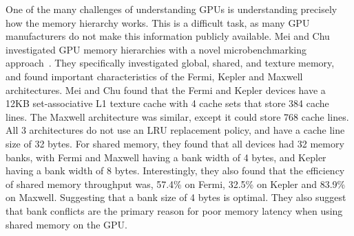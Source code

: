 One of the many challenges of understanding GPUs is understanding precisely how the memory hierarchy works.
This is a difficult task, as many GPU manufacturers do not make this information publicly available.
Mei and Chu investigated GPU memory hierarchies with a novel microbenchmarking approach~\cite{Mei2015}.
They specifically investigated global, shared, and texture memory, and found important characteristics of the Fermi, Kepler and Maxwell architectures.
Mei and Chu found that the Fermi and Kepler devices have a 12KB set-associative L1 texture cache with 4 cache sets that store 384 cache lines.
The Maxwell architecture was similar, except it could store 768 cache lines.
All 3 architectures do not use an LRU replacement policy, and have a cache line size of 32 bytes.
For shared memory, they found that all devices had 32 memory banks, with Fermi and Maxwell having a bank width of 4 bytes, and Kepler having a bank width of 8 bytes.
Interestingly, they also found that the efficiency of shared memory throughput was, 57.4\% on Fermi, 32.5\% on Kepler and 83.9\% on Maxwell.
Suggesting that a bank size of 4 bytes is optimal.
They also suggest that bank conflicts are the primary reason for poor memory latency when using shared memory on the GPU.
